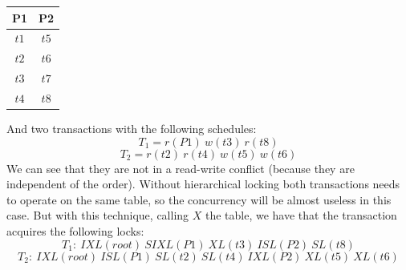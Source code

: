 \begin{itemize}
\begin{example}
        \begin{table}[H]
            \centering
            \begin{tabular}{cc}
            \textbf{P1}                 & \textbf{P2}               \\ \hline
            \multicolumn{1}{|c|}{$t1$}  & \multicolumn{1}{c|}{$t5$} \\ \hline
            \multicolumn{1}{|c|}{$t2$}  & \multicolumn{1}{c|}{$t6$} \\ \hline
            \multicolumn{1}{|c|}{$t3$}  & \multicolumn{1}{c|}{$t7$} \\ \hline
            \multicolumn{1}{|c|}{$t4$}  & \multicolumn{1}{c|}{$t8$} \\ \hline
            \end{tabular}
        \end{table}
        And two transactions with the following schedules: 
        \[T_1=r(P1)\:w(t3)\:r(t8)\]
        \[T_2=r(t2)\:r(t4)\:w(t5)\:w(t6)\]
        We can see that they are not in a read-write conflict (because they are independent of the order). 
        Without hierarchical locking both transactions needs to operate on the same table, so the concurrency will be almost useless in this case. 
        But with this technique, calling $X$ the table, we have that the transaction acquires the following locks: 
        \[T_1:\:IXL(root)\:SIXL(P1)\:XL(t3)\:ISL(P2)\:SL(t8)\]
        \[T_2:\:IXL(root)\:ISL(P1)\:SL(t2)\:SL(t4)\:IXL(P2)\:XL(t5)\:XL(t6)\]
    \end{example}
\end{itemize}